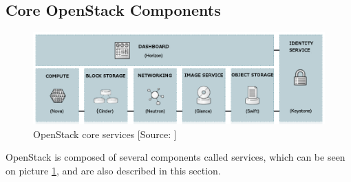 \subsection{Core OpenStack Components}
\begin{figure}[!h]
  \includegraphics[width=\textwidth]{fig/openstack_services.png}
  \caption{OpenStack core services [Source: \cite{ServicesImageSource}]}
  \label{fig:openstack_services}
\end{figure}
OpenStack is composed of several components \cite{CL210} called services, which can be seen on picture \ref{fig:openstack_services}, and are also described in this section.
